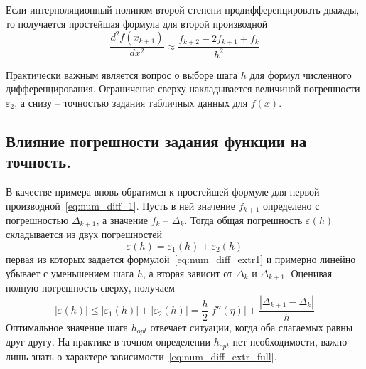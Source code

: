 Если интерполяционный полином второй степени продифференцировать дважды, то получается простейшая формула для второй
производной
\begin{equation}
    \frac{d^2 f(x_{k+1})}{dx^2} \approx \frac{f_{k+2} - 2f_{k+1} + f_k}{h^2}
\end{equation}
\vspace{10pt}

Практически важным является вопрос о выборе шага $h$ для формул численного дифференцирования. Ограничение сверху
накладывается величиной погрешности $\varepsilon_2$, а снизу -- точностью задания табличных данных для $f(x)$.

\subsection{Влияние погрешности задания функции на точность.}
В качестве примера вновь обратимся к простейшей формуле для первой производной~\eqref{eq:num_diff_1}. Пусть в ней
значение $f_{k+1}$ определено с погрешностью $\Delta_{k+1}$, а значение $f_k$ -- $\Delta_k$. Тогда общая погрешность $\varepsilon(h)$
складывается из двух погрешностей
\begin{equation*}
    \varepsilon(h) = \varepsilon_1(h) + \varepsilon_2(h)
\end{equation*}
первая из которых задается формулой~\eqref{eq:num_diff_extr1} и примерно линейно убывает с уменьшением шага $h$, а вторая
зависит от $\Delta_k$ и $\Delta_{k+1}$. Оценивая полную погрешность сверху, получаем
\begin{equation}
    \left| \varepsilon(h) \right| \leq \left| \varepsilon_1(h) \right| + \left| \varepsilon_2(h) \right| = \frac{h}{2} \left| f''(\eta) \right| + \frac{\left| \Delta_{k+1} - \Delta_k \right|}{h} \label{eq:num_diff_extr_full}
\end{equation}
Оптимальное значение шага $h_{opt}$ отвечает ситуации, когда оба слагаемых равны друг другу. На практике в точном
определении $h_{opt}$ нет необходимости, важно лишь знать о характере зависимости~\eqref{eq:num_diff_extr_full}.
